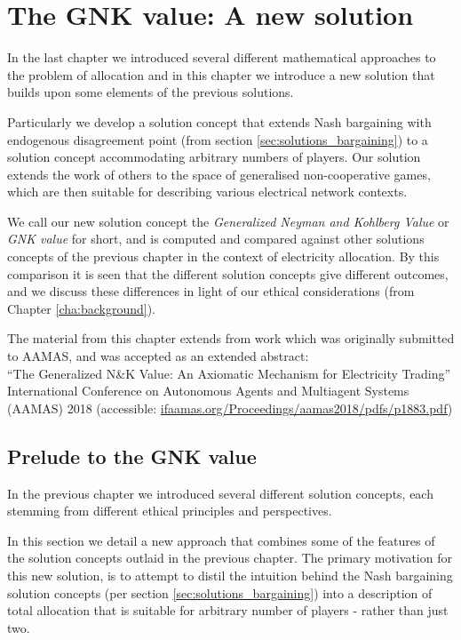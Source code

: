 \chapter{The GNK value: A new solution}
\label{cha:new_solution}

In the last chapter we introduced several different mathematical approaches to the problem of allocation and in this chapter we introduce a new solution that builds upon some elements of the previous solutions.

Particularly we develop a solution concept that extends Nash bargaining with endogenous disagreement point (from section \ref{sec:solutions_bargaining}) to a solution concept accommodating arbitrary numbers of players.
Our solution extends the work of others to the space of generalised non-cooperative games, which are then suitable for describing various electrical network contexts.

We call our new solution concept the \textit{Generalized Neyman and Kohlberg Value} or \textit{GNK value} for short, and is computed and compared against other solutions concepts of the previous chapter in the context of electricity allocation.
By this comparison it is seen that the different solution concepts give different outcomes, and we discuss these differences in light of our ethical considerations (from Chapter \ref{cha:background}).

The material from this chapter extends from work which was originally submitted to AAMAS, and was accepted as an extended abstract: \\
\-\hspace{5mm}``The Generalized N\&K Value: An Axiomatic Mechanism for Electricity Trading''\\ International Conference on Autonomous Agents and Multiagent Systems\\ (AAMAS) 2018 (accessible: \href{ifaamas.org/Proceedings/aamas2018/pdfs/p1883.pdf}{ifaamas.org/Proceedings/aamas2018/pdfs/p1883.pdf})


\section{Prelude to the GNK value}

In the previous chapter we introduced several different solution concepts, each stemming from different ethical principles and perspectives.

In this section we detail a new approach that combines some of the features of the solution concepts outlaid in the previous chapter.
The primary motivation for this new solution, is to attempt to distil the intuition behind the Nash bargaining solution concepts (per section \ref{sec:solutions_bargaining}) into a description of total allocation that is suitable for arbitrary number of players - rather than just two.



